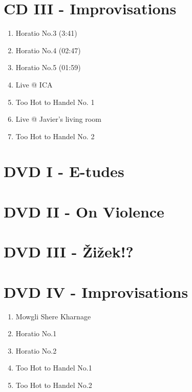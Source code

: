 \section*{CD III - Improvisations}

\begin{enumerate}
\item Horatio No.3 (3:41)
\item Horatio No.4 (02:47)
\item Horatio No.5 (01:59)
\item Live @ ICA
\item Too Hot to Handel No. 1
\item Live @ Javier's living room
\item Too Hot to Handel No. 2
\end{enumerate}

\section*{DVD I - E-tudes}

\section*{DVD II - On Violence}

\section*{DVD III - \v{Z}i\v{z}ek!?}

\section*{DVD IV - Improvisations}

\begin{enumerate}
\item Mowgli Shere Kharnage
\item Horatio No.1 
\item Horatio No.2 
\item Too Hot to Handel No.1
\item Too Hot to Handel No.2
\end{enumerate}